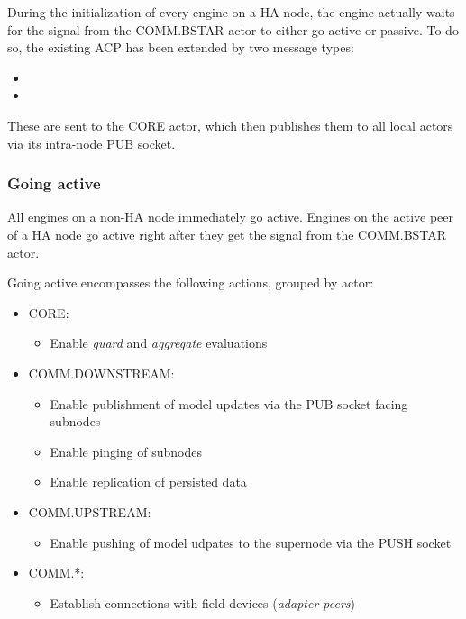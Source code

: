 During the initialization of every engine on a HA node, the engine actually
waits for the signal from the COMM.BSTAR actor to either go active or passive.
To do so, the existing \gls{ACP} has been extended by two message types:
\begin{itemize}
	\item {}
	\item {}
\end{itemize}

These are sent to the CORE actor, which then publishes them to all local actors
via its intra-node PUB socket.

\subsubsection{Going active}
All engines on a non-HA node immediately go active. Engines on the active peer
of a HA node go active right after they get the signal from the COMM.BSTAR
actor.

Going active encompasses the following actions, grouped by actor:
\begin{itemize}
	\item CORE:
		\begin{itemize}
			\item Enable \emph{guard} and \emph{aggregate} evaluations
		\end{itemize}
	\item COMM.DOWNSTREAM:
		\begin{itemize}
			\item Enable publishment of model updates via the PUB socket facing subnodes
			\item Enable pinging of subnodes
			\item Enable replication of persisted data
		\end{itemize}
	\item COMM.UPSTREAM:
		\begin{itemize}
			\item Enable pushing of model udpates to the supernode via the PUSH socket
		\end{itemize}
	\item COMM.*:
		\begin{itemize}
			\item Establish connections with field devices (\emph{adapter peers})
		\end{itemize}
\end{itemize}


